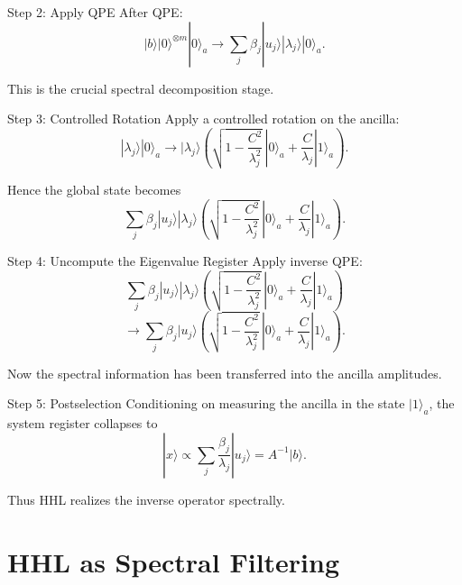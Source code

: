 \documentclass{beamer}
\begin{document}

\begin{frame}{Step 2: Apply QPE}
After QPE:
\[
|b\rangle |0\rangle^{\otimes m}|0\rangle_a
\longrightarrow
\sum_j \beta_j |u_j\rangle |\lambda_j\rangle |0\rangle_a.
\]

This is the crucial spectral decomposition stage.
\end{frame}


\begin{frame}{Step 3: Controlled Rotation}
Apply a controlled rotation on the ancilla:
\[
|\lambda_j\rangle |0\rangle_a
\longrightarrow
|\lambda_j\rangle
\left(
\sqrt{1-\frac{C^2}{\lambda_j^2}}\,|0\rangle_a
+
\frac{C}{\lambda_j}|1\rangle_a
\right).
\]

Hence the global state becomes
\[
\sum_j \beta_j |u_j\rangle |\lambda_j\rangle
\left(
\sqrt{1-\frac{C^2}{\lambda_j^2}}\,|0\rangle_a
+
\frac{C}{\lambda_j}|1\rangle_a
\right).
\]
\end{frame}


\begin{frame}{Step 4: Uncompute the Eigenvalue Register}
Apply inverse QPE:
\[
\sum_j \beta_j |u_j\rangle |\lambda_j\rangle
\left(
\sqrt{1-\frac{C^2}{\lambda_j^2}}\,|0\rangle_a
+
\frac{C}{\lambda_j}|1\rangle_a
\right)
\]
\[
\longrightarrow
\sum_j \beta_j |u_j\rangle
\left(
\sqrt{1-\frac{C^2}{\lambda_j^2}}\,|0\rangle_a
+
\frac{C}{\lambda_j}|1\rangle_a
\right).
\]

Now the spectral information has been transferred into the ancilla amplitudes.
\end{frame}


\begin{frame}{Step 5: Postselection}
Conditioning on measuring the ancilla in the state \(|1\rangle_a\), the system register collapses to
\[
|x\rangle \propto \sum_j \frac{\beta_j}{\lambda_j}|u_j\rangle
= A^{-1}|b\rangle.
\]

Thus HHL realizes the inverse operator spectrally.
\end{frame}

\section{HHL as Spectral Filtering}
\end{document}
